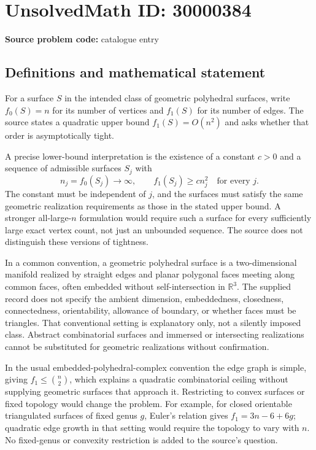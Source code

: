 \documentclass[11pt]{article}
\newcommand{\R}{\mathbb{R}}
\begin{document}
\section*{UnsolvedMath ID: 30000384}
\textbf{Source problem code:} catalogue entry
\subsection{Definitions and mathematical statement}
For a surface \(S\) in the intended class of geometric polyhedral surfaces, write \(f_0(S)=n\) for its number of vertices and \(f_1(S)\) for its number of edges. The source states a quadratic upper bound \(f_1(S)=O(n^2)\) and asks whether that order is asymptotically tight.

A precise lower-bound interpretation is the existence of a constant \(c>0\) and a sequence of admissible surfaces \(S_j\) with
\[
 n_j=f_0(S_j)\longrightarrow\infty,\qquad
 f_1(S_j)\geq c n_j^2\quad\text{for every }j.
\]
The constant must be independent of \(j\), and the surfaces must satisfy the same geometric realization requirements as those in the stated upper bound. A stronger all-large-\(n\) formulation would require such a surface for every sufficiently large exact vertex count, not just an unbounded sequence. The source does not distinguish these versions of tightness.

In a common convention, a geometric polyhedral surface is a two-dimensional manifold realized by straight edges and planar polygonal faces meeting along common faces, often embedded without self-intersection in \(\R^3\). The supplied record does not specify the ambient dimension, embeddedness, closedness, connectedness, orientability, allowance of boundary, or whether faces must be triangles. That conventional setting is explanatory only, not a silently imposed class. Abstract combinatorial surfaces and immersed or intersecting realizations cannot be substituted for geometric realizations without confirmation.

In the usual embedded-polyhedral-complex convention the edge graph is simple, giving \(f_1\leq\binom n2\), which explains a quadratic combinatorial ceiling without supplying geometric surfaces that approach it. Restricting to convex surfaces or fixed topology would change the problem. For example, for closed orientable triangulated surfaces of fixed genus \(g\), Euler's relation gives \(f_1=3n-6+6g\); quadratic edge growth in that setting would require the topology to vary with \(n\). No fixed-genus or convexity restriction is added to the source's question.
\end{document}
